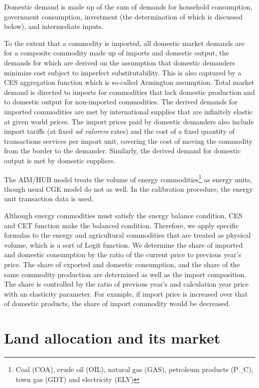 \documentclass[10pt,a4paper,titlepage,dvipdfmx]{book}
\begin{document}
Domestic demand is made up of the sum of demands for household consumption, government consumption, investment (the determination of which is discussed below), and intermediate inputs.

To the extent that a commodity is imported, all domestic market demands are for a composite commodity made up of imports and domestic output, the demands for which are derived on the assumption that domestic demanders minimize cost subject to imperfect substitutability. This is also captured by a CES aggregation function which is so-called Armington assumption. Total market demand is directed to imports for commodities that lack domestic production and to domestic output for non-imported commodities. The derived demands for imported commodities are met by international supplies that are infinitely elastic at given world prices. The import prices paid by domestic demanders also include import tariffs (at fixed \textit{ad valorem} rates) and the cost of a fixed quantity of transactions services per import unit, covering the cost of moving the commodity from the border to the demander. Similarly, the derived demand for domestic output is met by domestic suppliers. 

The AIM/HUB model treats the volume of energy commodities\footnote{Coal (COA), crude oil (OIL), natural gas (GAS), petroleum products (P\_C), town gas (GDT) and electricity (ELY)} as energy units, though usual CGE model do not as well. In the calibration procedure, the energy unit transaction data is used.

Although energy commodities must satisfy the energy balance condition, CES and CET function make the balanced condition. Therefore, we apply specific formulas to the energy and agricultural commodities that are treated as physical volume, which is a sort of Logit function. We determine the share of imported and domestic consumption by the ratio of the current price to previous year's price. The share of exported and domestic consumption, and the share of the same commodity production are determined as well as the import composition. The share is controlled by the ratio of previous year's and calculation year price with an elasticity parameter. For example, if import price is increased over that of domestic products, the share of import commodity would be decreased.

\section{\label{sec:LanAlloMar}Land allocation and its market}
\end{document}
